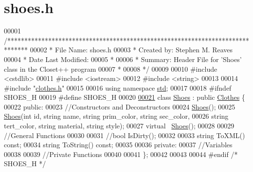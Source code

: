 \hypertarget{shoes_8h_source}{}\section{shoes.\+h}

\begin{DoxyCode}
00001 \textcolor{comment}{/******************************************************************************}
00002 \textcolor{comment}{ * File Name: shoes.h}
00003 \textcolor{comment}{ * Created by: Stephen M. Reaves}
00004 \textcolor{comment}{ * Date Last Modified:}
00005 \textcolor{comment}{ *}
00006 \textcolor{comment}{ * Summary: Header File for 'Shoes' class in the Closet++ program}
00007 \textcolor{comment}{ *}
00008 \textcolor{comment}{ */}
00009 
00010 \textcolor{preprocessor}{#include <cstdlib>}
00011 \textcolor{preprocessor}{#include <iostream>}
00012 \textcolor{preprocessor}{#include <string>}
00013 
00014 \textcolor{preprocessor}{#include "\mbox{\hyperlink{clothes_8h}{clothes.h}}"}
00015 
00016 \textcolor{keyword}{using namespace }\mbox{\hyperlink{namespacestd}{std}};
00017 
00018 \textcolor{preprocessor}{#ifndef SHOES\_H}
00019 \textcolor{preprocessor}{#define SHOES\_H}
00020 
\mbox{\hyperlink{classShoes}{00021}} \textcolor{keyword}{class }\mbox{\hyperlink{classShoes}{Shoes}} : \textcolor{keyword}{public} \mbox{\hyperlink{classClothes}{Clothes}} \{
00022   \textcolor{keyword}{public}:
00023     \textcolor{comment}{//Constructors and Deconstructors}
00024     \mbox{\hyperlink{classShoes}{Shoes}}();
00025     \mbox{\hyperlink{classShoes}{Shoes}}(\textcolor{keywordtype}{int} \textcolor{keywordtype}{id}, \textcolor{keywordtype}{string} name, \textcolor{keywordtype}{string} prim\_color, \textcolor{keywordtype}{string} sec\_color, 
00026           \textcolor{keywordtype}{string} tert\_color, \textcolor{keywordtype}{string} material, \textcolor{keywordtype}{string} style); 
00027     \textcolor{keyword}{virtual} ~\mbox{\hyperlink{classShoes}{Shoes}}();
00028 
00029     \textcolor{comment}{//General Functions}
00030 
00031     \textcolor{comment}{//bool IsDirty();}
00032 
00033     \textcolor{keywordtype}{string} ToXML() \textcolor{keyword}{const};
00034     \textcolor{keywordtype}{string} ToString() \textcolor{keyword}{const};
00035   
00036   \textcolor{keyword}{private}:
00037     \textcolor{comment}{//Variables}
00038 
00039     \textcolor{comment}{//Private Functions}
00040 
00041 \};
00042 
00043 
00044 \textcolor{preprocessor}{#endif }\textcolor{comment}{/* SHOES\_H */}\textcolor{preprocessor}{ }
\end{DoxyCode}
